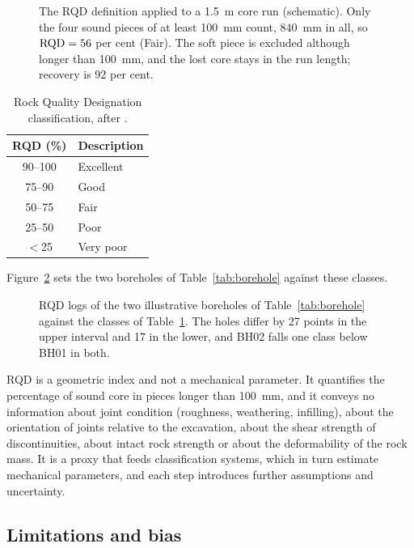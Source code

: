 \begin{figure}[htbp]
\centering
{}
\caption{The RQD definition applied to a 1.5~m core run (schematic). Only the four sound pieces of at least 100~mm count, 840~mm in all, so $\mathrm{RQD} = 56$ per cent (Fair). The soft piece is excluded although longer than 100~mm, and the lost core stays in the run length; recovery is 92 per cent.}
\label{fig:rqd-core-run}
\end{figure}

\begin{table}[htbp]
\caption{Rock Quality Designation classification, after \citet{deere1964technical}.}
\label{tab:rqd}
\centering
\small
\begin{tabular}{cl}
\toprule
\textbf{RQD (\%)} & \textbf{Description} \\
\midrule
90--100 & Excellent \\
75--90 & Good \\
50--75 & Fair \\
25--50 & Poor \\
$<$25 & Very poor \\
\bottomrule
\end{tabular}
\end{table}

Figure~\ref{fig:borehole-rqd-logs} sets the two boreholes of
Table~\ref{tab:borehole} against these classes.

\begin{figure}[htbp]
\centering
{}
\caption{RQD logs of the two illustrative boreholes of Table~\ref{tab:borehole} against the classes of Table~\ref{tab:rqd}. The holes differ by 27 points in the upper interval and 17 in the lower, and BH02 falls one class below BH01 in both.}
\label{fig:borehole-rqd-logs}
\end{figure}

RQD is a geometric index and not a mechanical parameter. It quantifies the
percentage of sound core in pieces longer than 100~mm, and it conveys no
information about joint condition (roughness, weathering, infilling), about
the orientation of joints relative to the excavation, about the shear
strength of discontinuities, about intact rock strength or about the
deformability of the rock mass. It is a proxy that feeds
classification systems, which in turn estimate mechanical parameters, and
each step introduces further assumptions and uncertainty.

\subsection{Limitations and bias}
\label{sec:orientation-bias}

